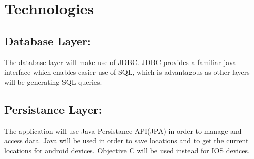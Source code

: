 \documentclass[11pt]{article}
\begin{document}
\section{Technologies}
\subsection{Database Layer:}
	The database layer will make use of JDBC. JDBC provides a familiar java interface which enables easier use of SQL, which is 		advantagous as other layers will be generating SQL queries.
\subsection{Persistance Layer:}
	The application will use Java Persistance API(JPA) in order to manage and access data.
	Java will be used in order to save locations and to get the current locations for android devices.
	Objective C will be used instead for IOS devices.
\end{document}
